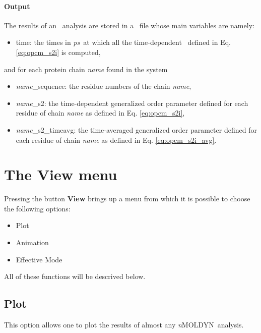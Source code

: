 \documentclass[a4paper,11pt]{report}
\newcommand{\ps}{\textit{ps}}
\newcommand{\NMOLDYN}{\textit{n}MOLDYN}
\begin{document}
\paragraph{Output\\}
The results of an \OPCM\ analysis are stored in a \NetCDF\ file whose main variables are namely:
\begin{itemize}
\item time: the times in \ps\ at which all the time-dependent \OPCM\ defined in Eq. \ref{eq:opcm_s2i} is computed,
\end{itemize}
and for each protein chain \textit{name} found in the system
\begin{itemize}
\item \textit{name}\_sequence: the residue numbers of the chain \textit{name},
\item \textit{name}\_s2: the time-dependent generalized order parameter defined for each residue of chain 
\textit{name} as defined in Eq. \ref{eq:opcm_s2i},
\item \textit{name}\_s2\_timeavg: the time-averaged generalized order parameter defined for each residue of chain 
\textit{name} as defined in Eq. \ref{eq:opcm_s2i_avg}.
\end{itemize}

\section{The \textbf{View} menu}
\label{view_menu}
Pressing the button \textbf{View} brings up a menu from which it is possible to choose the following options:
\begin{itemize}
\item Plot
\item Animation
\item Effective Mode
\end{itemize}
All of these functions will be descrived below.

\subsection{Plot}
\label{plot}
This option allows one to plot the results of almost any \NMOLDYN\ analysis. 
\end{document}

